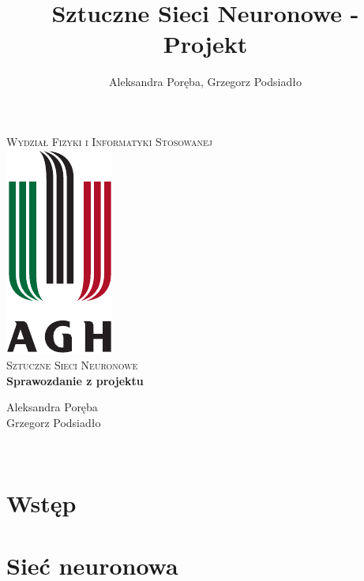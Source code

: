 \documentclass[12pt]{article}
\title{Sztuczne Sieci Neuronowe - Projekt}
\author{Aleksandra Poręba, Grzegorz Podsiadło}
\makeatletter
\let\thetitle\@title
\let\theauthor\@author
\makeatother
\begin{document}
\begin{center}
\textsc{\normalsize Wydział Fizyki i Informatyki Stosowanej}\\[2.0cm] 
\includegraphics[scale = 1]{logo.pdf}\\[1cm] 
\textsc{\Large Sztuczne Sieci Neuronowe}\\[0.4cm] 


{ \huge \bfseries \LARGE{Sprawozdanie z projektu} } 

\flushright \Large Aleksandra Poręba \\ Grzegorz Podsiadło

\vfill 

\center {\today}\\[2cm] 


\pagebreak 

\end{center}

\setcounter{tocdepth}{2}
\tableofcontents
\pagebreak


\pagestyle{fancy}
\fancyhf{}

\rhead{\theauthor}
\lhead{\thetitle}
\cfoot{\thepage}

\section{Wstęp}

\pagebreak
\section{Sieć neuronowa}
\end{document}
